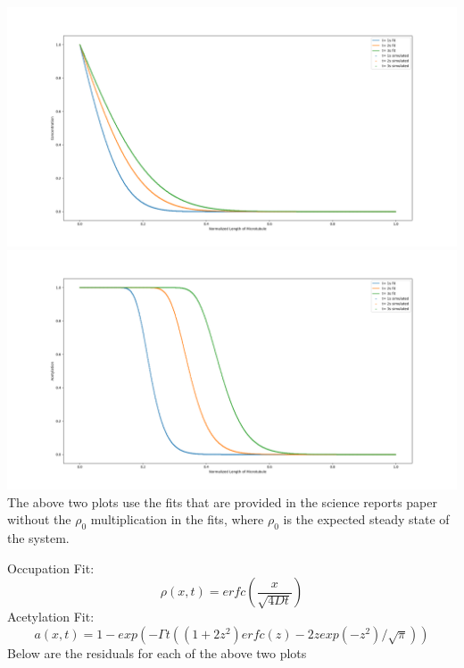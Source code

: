 \documentclass[]{article}
\begin{document}
\includegraphics[width=\linewidth]{OccupationFitsNoSteadyStateMultiplication}
\includegraphics[width=\linewidth]{AcetylationFitsWithoutSteadyStateMultiplication}
The above two plots use the fits that are provided in the science reports paper without the $\rho_0$ multiplication in the fits, where $\rho_0$ is the expected steady state of the system.

Occupation Fit:
\begin{equation}
\rho (x,t) =  erfc(\frac{x}{\sqrt{4Dt}})
\end{equation}
Acetylation Fit:
\begin{equation}
a(x,t) = 1-exp(-\Gamma t ( (1+2z^2)erfc(z) - 2z exp(-z^2)/\sqrt{\pi}))
\end{equation}
Below are the residuals for each of the above two plots
\end{document}
